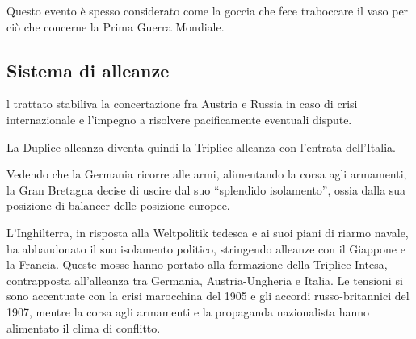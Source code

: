 \documentclass[a4paper]{article}
\newcommand{\quotes}[1]{``#1''}
\begin{document}
Questo evento è spesso considerato come la goccia che fece traboccare il vaso
per ciò che concerne la Prima Guerra Mondiale.

\subsection{Sistema di alleanze}


l trattato stabiliva la concertazione fra Austria e Russia in caso
di crisi internazionale e l'impegno a risolvere pacificamente eventuali dispute.



La Duplice alleanza diventa quindi la Triplice alleanza 
con l'entrata dell'Italia.


Vedendo che la Germania ricorre alle armi, alimentando la corsa agli armamenti, la Gran Bretagna
decise di uscire dal suo \quotes{splendido isolamento}, ossia dalla sua posizione di balancer delle
posizione europee.

L'Inghilterra, in risposta alla Weltpolitik tedesca e ai suoi
piani di riarmo navale, ha abbandonato il suo isolamento politico,
stringendo alleanze con il Giappone e la Francia.
Queste mosse hanno portato alla formazione della Triplice Intesa,
contrapposta all'alleanza tra Germania,
Austria-Ungheria e Italia.
Le tensioni si sono accentuate con la crisi marocchina del 1905 e
gli accordi russo-britannici del 1907, mentre la corsa agli armamenti e
la propaganda nazionalista hanno alimentato il clima di conflitto.

\end{document}
